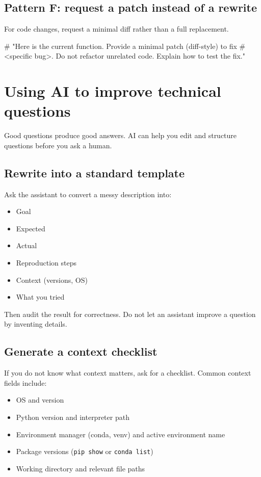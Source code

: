 \subsection{Pattern F: request a patch instead of a rewrite}
For code changes, request a minimal diff rather than a full replacement.
\begin{fullcode}
# "Here is the current function. Provide a minimal patch (diff-style) to fix
# <specific bug>. Do not refactor unrelated code. Explain how to test the fix."
\end{fullcode}

\section{Using AI to improve technical questions}
Good questions produce good answers. AI can help you edit and structure questions before you ask a human.

\subsection{Rewrite into a standard template}
Ask the assistant to convert a messy description into:
\begin{itemize}[noitemsep]
  \item Goal
  \item Expected
  \item Actual
  \item Reproduction steps
  \item Context (versions, OS)
  \item What you tried
\end{itemize}

Then audit the result for correctness. Do not let an assistant improve a question by inventing details.

\subsection{Generate a context checklist}
If you do not know what context matters, ask for a checklist. Common context fields include:
\begin{itemize}[noitemsep]
  \item OS and version
  \item Python version and interpreter path
  \item Environment manager (conda, venv) and active environment name
  \item Package versions (\texttt{pip show} or \texttt{conda list})
  \item Working directory and relevant file paths
\end{itemize}

